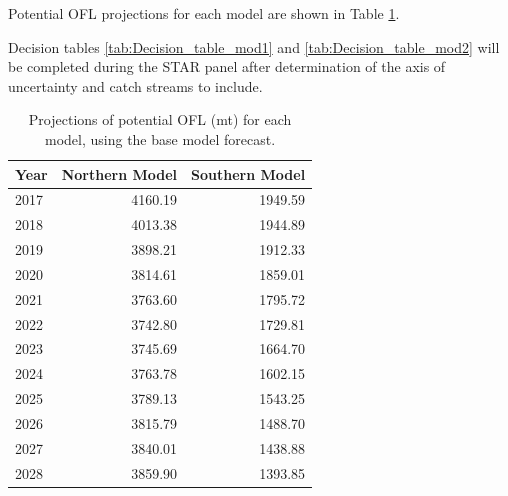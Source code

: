 \documentclass[12pt,]{article}
\begin{document}
Potential OFL projections for each model are shown in Table
\ref{tab:OFL_projection}.

Decision tables \ref{tab:Decision_table_mod1} and
\ref{tab:Decision_table_mod2} will be completed during the STAR panel
after determination of the axis of uncertainty and catch streams to
include.

\begin{table}[ht]
\centering
\caption{Projections of potential OFL (mt) for each model, using the base model forecast.} 
\label{tab:OFL_projection}
\begin{tabular}{lrr}
  \hline
Year & Northern Model & Southern Model \\ 
  \hline
2017 & 4160.19 & 1949.59 \\ 
  2018 & 4013.38 & 1944.89 \\ 
  2019 & 3898.21 & 1912.33 \\ 
  2020 & 3814.61 & 1859.01 \\ 
  2021 & 3763.60 & 1795.72 \\ 
  2022 & 3742.80 & 1729.81 \\ 
  2023 & 3745.69 & 1664.70 \\ 
  2024 & 3763.78 & 1602.15 \\ 
  2025 & 3789.13 & 1543.25 \\ 
  2026 & 3815.79 & 1488.70 \\ 
  2027 & 3840.01 & 1438.88 \\ 
  2028 & 3859.90 & 1393.85 \\ 
   \hline
\end{tabular}
\end{table}\begin{table}[ht]
\centering
\caption{Summary of 10-year 
                                             projections beginning in 2018 
                                             for alternate states of nature based on 
                                             an axis of uncertainty for the Northern model.  Columns range over low, mid, and high
                                             states of nature, and rows range over different 
                                             assumptions of catch levels. An entry of "--" 
                                             indicates that the stock is driven to very low 
                                             abundance under the particular scenario.} 
\label{tab:Decision_table_mod1}
\end{table}
\end{document}
